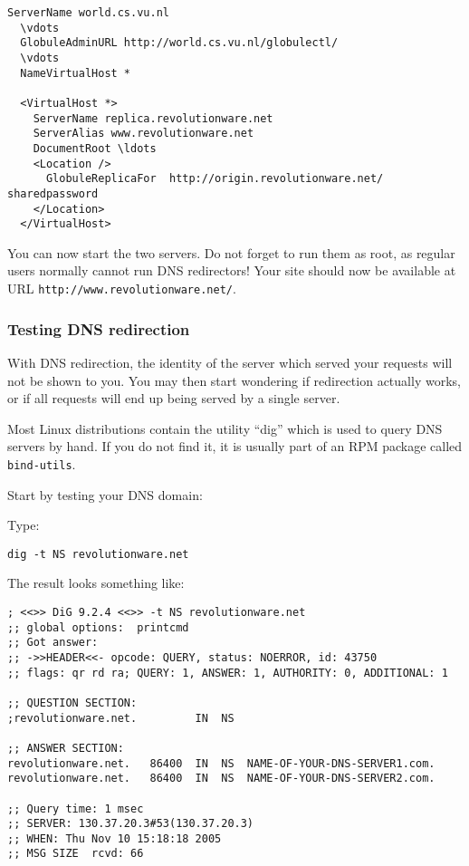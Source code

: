 \documentclass[10pt,a4paper]{article}
\makeatletter
\newenvironment{p}{\@open{P}{}}{\@close{P}}
\newenvironment{p}{}{\par}
\makeatother
\begin{document}
\begin{Verbatim}[label={Replica server's config}]
  ServerName world.cs.vu.nl
  \vdots
  GlobuleAdminURL http://world.cs.vu.nl/globulectl/
  \vdots
  NameVirtualHost *
  
  <VirtualHost *>
    ServerName replica.revolutionware.net
    ServerAlias www.revolutionware.net
    DocumentRoot \ldots
    <Location />
      GlobuleReplicaFor  http://origin.revolutionware.net/  sharedpassword
    </Location>
  </VirtualHost>
\end{Verbatim}

\begin{p}
You can now start the two servers.  Do not forget to run them as root, as
regular users normally cannot run DNS redirectors! Your site should now be
available at URL \verb!http://www.revolutionware.net/!.
\end{p}

\subsubsection{Testing DNS redirection}

\begin{p}
With DNS redirection, the identity of the server which served your requests
will not be shown to you.  You may then start wondering if redirection
actually works, or if all requests will end up being served by a single
server.
\end{p}

\begin{p}
Most Linux distributions contain the utility ``dig'' which is used to query
DNS servers by hand.  If you do not find it, it is usually part of an RPM
package called \verb!bind-utils!.
\end{p}

\begin{p}
Start by testing your DNS domain:
\end{p}

Type:
\begin{Verbatim}
dig -t NS revolutionware.net
\end{Verbatim}

\begin{p}
The result looks something like:
\end{p}
\begin{Verbatim}
; <<>> DiG 9.2.4 <<>> -t NS revolutionware.net
;; global options:  printcmd
;; Got answer:
;; ->>HEADER<<- opcode: QUERY, status: NOERROR, id: 43750
;; flags: qr rd ra; QUERY: 1, ANSWER: 1, AUTHORITY: 0, ADDITIONAL: 1

;; QUESTION SECTION:
;revolutionware.net.         IN  NS

;; ANSWER SECTION:
revolutionware.net.   86400  IN  NS  NAME-OF-YOUR-DNS-SERVER1.com.
revolutionware.net.   86400  IN  NS  NAME-OF-YOUR-DNS-SERVER2.com.

;; Query time: 1 msec
;; SERVER: 130.37.20.3#53(130.37.20.3)
;; WHEN: Thu Nov 10 15:18:18 2005
;; MSG SIZE  rcvd: 66
\end{Verbatim}
\end{document}
